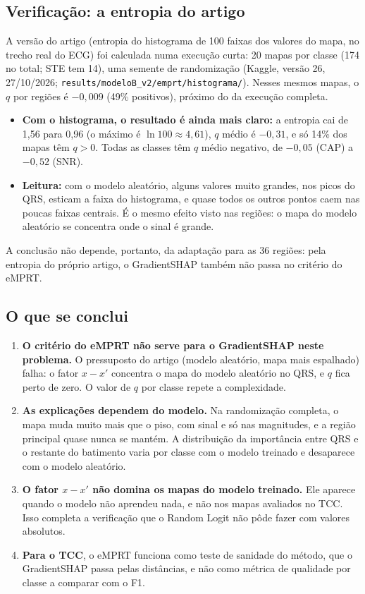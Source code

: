 \documentclass[11pt,a4paper]{article}
\begin{document}
\subsection{Verificação: a entropia do artigo}
A versão do artigo (entropia do histograma de 100 faixas dos valores do mapa, no trecho real do ECG) foi calculada numa execução curta: 20 mapas por classe (174 no total; STE tem 14), uma semente de randomização (Kaggle, versão 26, 27/10/2026; \texttt{results/modeloB\_v2/emprt/histograma/}). Nesses mesmos mapas, o $q$ por regiões é $-0{,}009$ (49\% positivos), próximo do da execução completa.
\begin{itemize}
\item \textbf{Com o histograma, o resultado é ainda mais claro:} a entropia cai de 1,56 para 0,96 (o máximo é $\ln 100 \approx 4{,}61$), $q$ médio é $-0{,}31$, e só 14\% dos mapas têm $q > 0$. Todas as classes têm $q$ médio negativo, de $-0{,}05$ (CAP) a $-0{,}52$ (SNR).
\item \textbf{Leitura:} com o modelo aleatório, alguns valores muito grandes, nos picos do QRS, esticam a faixa do histograma, e quase todos os outros pontos caem nas poucas faixas centrais. É o mesmo efeito visto nas regiões: o mapa do modelo aleatório se concentra onde o sinal é grande.
\end{itemize}
A conclusão não depende, portanto, da adaptação para as 36 regiões: pela entropia do próprio artigo, o GradientSHAP também não passa no critério do eMPRT.

\subsection{O que se conclui}
\begin{enumerate}
\item \textbf{O critério do eMPRT não serve para o GradientSHAP neste problema.} O pressuposto do artigo (modelo aleatório, mapa mais espalhado) falha: o fator $x - x'$ concentra o mapa do modelo aleatório no QRS, e $q$ fica perto de zero. O valor de $q$ por classe repete a complexidade.
\item \textbf{As explicações dependem do modelo.} Na randomização completa, o mapa muda muito mais que o piso, com sinal e só nas magnitudes, e a região principal quase nunca se mantém. A distribuição da importância entre QRS e o restante do batimento varia por classe com o modelo treinado e desaparece com o modelo aleatório.
\item \textbf{O fator $x - x'$ não domina os mapas do modelo treinado.} Ele aparece quando o modelo não aprendeu nada, e não nos mapas avaliados no TCC. Isso completa a verificação que o Random Logit não pôde fazer com valores absolutos.
\item \textbf{Para o TCC}, o eMPRT funciona como teste de sanidade do método, que o GradientSHAP passa pelas distâncias, e não como métrica de qualidade por classe a comparar com o F1.
\end{enumerate}
\end{document}
